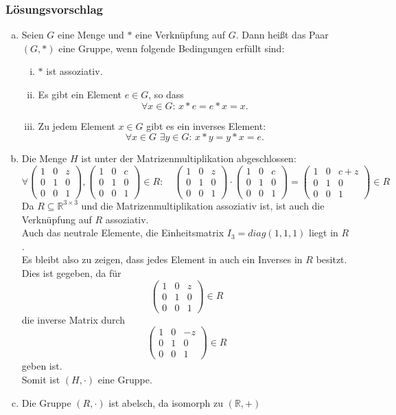 \documentclass[a4paper,11pt]{scrartcl}
\newcounter{auf}
\newcommand{\RR}{\mathbb{R}}
\begin{document}
\subsubsection*{Lösungsvorschlag}
\begin{enumerate}[a)]
\item Seien $G$ eine Menge und $\ast$ eine Verknüpfung auf $G$.
	Dann heißt das Paar $(G,\ast)$ eine  Gruppe, wenn folgende Bedingungen erfüllt sind:
	\begin{enumerate}[i)]
		\item $\ast$ ist assoziativ. 
		\item Es gibt ein Element $e\in G$, so dass
			$$
				\forall x\in G:\, x\ast e = e\ast x = x.
			$$

		\item Zu jedem Element $x\in G$ gibt es ein inverses Element:
			$$
				\forall x\in G\,\, \exists y\in G:\, x\ast y = y\ast x = e.
			$$
	\end{enumerate}
\item Die Menge $H$ ist unter der Matrizenmultiplikation abgeschlossen:
$$
 \forall \begin{pmatrix} 1&0&z\\0&1&0\\0&0&1 \end{pmatrix}, \begin{pmatrix} 1&0&c\\0&1&0\\0&0&1 \end{pmatrix} \in R: \quad \begin{pmatrix} 1&0&z\\0&1&0\\0&0&1 \end{pmatrix} \cdot \begin{pmatrix} 1&0&c\\0&1&0\\0&0&1 \end{pmatrix} =\begin{pmatrix} 1&0&c+z\\0&1&0\\0&0&1 \end{pmatrix} \in R 
$$
Da $R \subseteq \RR^{3\times 3}$ und die Matrizenmultiplikation assoziativ ist, ist auch die Verknüpfung auf $R$ assoziativ.\\
Auch das neutrale Elemente, die Einheitsmatrix $I_3=diag(1,1,1)$ liegt in $R$.\\
Es bleibt also zu zeigen, dass jedes Element in auch ein Inverses in $R$ besitzt. Dies ist gegeben, da für 
$$
 \begin{pmatrix} 1&0&z\\0&1&0\\0&0&1 \end{pmatrix} \in R
$$
die inverse Matrix durch
$$
 \begin{pmatrix} 1&0&-z\\0&1&0\\0&0&1 \end{pmatrix} \in R
$$
geben ist.\\
Somit ist $(H,\cdot)$ eine Gruppe.
\item Die Gruppe $(R,\cdot)$ ist  abelsch, da isomorph zu $(\RR,+)$
\end{enumerate}
\end{document}

